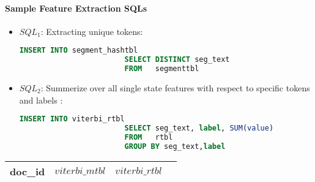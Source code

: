 \paragraph{Sample Feature Extraction SQLs}
\begin{itemize}
\item $SQL_1$: Extracting unique tokens:\\
              \begin{lstlisting}[language=SQL,gobble=4]
                        INSERT INTO segment_hashtbl
                        SELECT DISTINCT seg_text
                        FROM   segmenttbl
              \end{lstlisting}

\item $SQL_2$: Summerize over all single state features with respect to specific tokens and labels :\\
              \begin{lstlisting}[language=SQL,gobble=4]
                        INSERT INTO viterbi_rtbl
                        SELECT seg_text, label, SUM(value)
                        FROM   rtbl
                        GROUP BY seg_text,label
              \end{lstlisting}
\end{itemize}
\begin{center}
    \begin{tabular}{ | l | l | l | l |}
    \hline
    doc\_id & $viterbi\_mtbl$ & $viterbi\_rtbl$ \\ 
    \hline
    \end{tabular}
\end{center}

